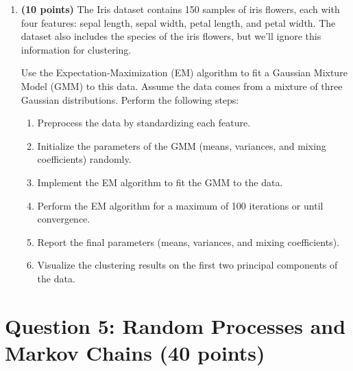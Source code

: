\documentclass{article}
\begin{document}
\begin{enumerate}
    \item \textbf{(10 points)} The Iris dataset contains 150 samples of iris flowers, each with four features: sepal length, sepal width, petal length, and petal width. The dataset also includes the species of the iris flowers, but we'll ignore this information for clustering.

    Use the Expectation-Maximization (EM) algorithm to fit a Gaussian Mixture Model (GMM) to this data. Assume the data comes from a mixture of three Gaussian distributions. Perform the following steps:
    \begin{enumerate}
        \item Preprocess the data by standardizing each feature.

        \item Initialize the parameters of the GMM (means, variances, and mixing coefficients) randomly.
        \item Implement the EM algorithm to fit the GMM to the data.
        
        \item Perform the EM algorithm for a maximum of 100 iterations or until convergence.
        \item Report the final parameters (means, variances, and mixing coefficients).
        \item Visualize the clustering results on the first two principal components of the data.
    \end{enumerate}
\end{enumerate}


\section*{Question 5: Random Processes and Markov Chains (40 points)}
\end{document}
